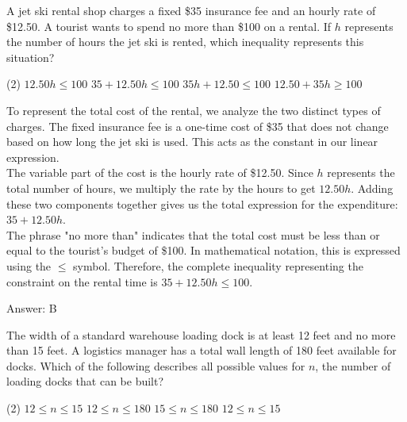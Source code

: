 \documentclass[11pt,paper=a4,answers]{exam}
\begin{document}
\begin{questions}
\pointsinrightmargin
\pointsdroppedatright
\marksnotpoints
{}
\pointformat{\boldmath\themarginpoints}
\bracketedpoints

\question
A jet ski rental shop charges a fixed \$35 insurance fee and an hourly rate of \$12.50. A tourist wants to spend no more than \$100 on a rental. If $h$ represents the number of hours the jet ski is rented, which inequality represents this situation?
\begin{tasks}(2)
    \task $12.50h \leq 100$
    \task $35 + 12.50h \leq 100$
    \task $35h + 12.50 \leq 100$
    \task $12.50 + 35h \geq 100$
\end{tasks}

\begin{solution}
To represent the total cost of the rental, we analyze the two distinct types of charges. The fixed insurance fee is a one-time cost of \$35 that does not change based on how long the jet ski is used. This acts as the constant in our linear expression. 
\\[10pt]
The variable part of the cost is the hourly rate of \$12.50. Since $h$ represents the total number of hours, we multiply the rate by the hours to get $12.50h$. Adding these two components together gives us the total expression for the expenditure: $35 + 12.50h$. 
\\[10pt]
The phrase "no more than" indicates that the total cost must be less than or equal to the tourist's budget of \$100. In mathematical notation, this is expressed using the $\leq$ symbol. Therefore, the complete inequality representing the constraint on the rental time is $35 + 12.50h \leq 100$.

\vspace{15pt}
Answer: \colorbox{yellow!100}{B}
\end{solution}

\question
The width of a standard warehouse loading dock is at least 12 feet and no more than 15 feet. A logistics manager has a total wall length of 180 feet available for docks. Which of the following describes all possible values for $n$, the number of loading docks that can be built?
\begin{tasks}(2)
    \task $12 \leq n \leq 15$
    \task $12 \leq n \leq 180$
    \task $15 \leq n \leq 180$
    \task $12 \leq n \leq 15$
\end{tasks}


\end{questions}
\end{document}
